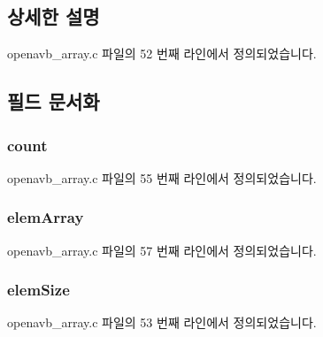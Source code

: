 \subsection{상세한 설명}


openavb\+\_\+array.\+c 파일의 52 번째 라인에서 정의되었습니다.



\subsection{필드 문서화}
\subsubsection[{\texorpdfstring{count}{count}}]{ count}\hypertarget{structopenavb__array_a18710850aec6737679ffcc04a45ab989}{}\label{structopenavb__array_a18710850aec6737679ffcc04a45ab989}


openavb\+\_\+array.\+c 파일의 55 번째 라인에서 정의되었습니다.

\subsubsection[{\texorpdfstring{elem\+Array}{elemArray}}]{ elem\+Array}\hypertarget{structopenavb__array_ad315cbed9826617bd40c9b0bb291d8fc}{}\label{structopenavb__array_ad315cbed9826617bd40c9b0bb291d8fc}


openavb\+\_\+array.\+c 파일의 57 번째 라인에서 정의되었습니다.

\subsubsection[{\texorpdfstring{elem\+Size}{elemSize}}]{ elem\+Size}\hypertarget{structopenavb__array_a838e119281056414fd5e0641cf388263}{}\label{structopenavb__array_a838e119281056414fd5e0641cf388263}


openavb\+\_\+array.\+c 파일의 53 번째 라인에서 정의되었습니다.


